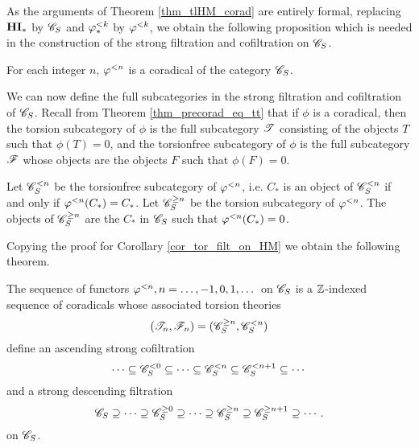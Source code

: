 As the arguments of Theorem \ref{thm_tlHM_corad} are 
entirely formal, replacing $\HM$ by $\CatLoc{C}{S}$ and $\tlHM{k}$ by
$\corad{k}$, we obtain the following proposition
which is needed in the construction of the strong filtration and
cofiltration on $\CatLoc{C}{S}$. 

\begin{prop}\label{prop_corad_loc_general}
For each integer $n$, $\corad{n}$ is a coradical of the category
$\CatLoc{C}{S}$.
\end{prop}

We can now define the full subcategories in the strong filtration
and cofiltration of $\CatLoc{C}{S}$. Recall from Theorem
\ref{thm_precorad_eq_tt} that if $\phi$ is a coradical, then the
torsion subcategory of $\phi$ is the full subcategory $\Cat{T}$
consisting of the objects $T$ such that $\phi(T) = 0$, and the
torsionfree subcategory of $\phi$ is the full subcategory $\Cat{F}$
whose objects are the objects $F$ such that $\phi(F) = 0$. 

\begin{defn}\label{def_torsion_filt_general}
Let $\Corad{n}{\CatLoc{C}{S}}$ be the torsionfree subcategory of
$\corad{n}$, i.e. $C_*$ is an object of $\Corad{n}{\CatLoc{C}{S}}$
if and only if $\corad{n}(C_*) = C_*$. Let 
$\Prerad{n}{\CatLoc{C}{S}}$ be the torsion subcategory of $\corad{n}$.
The objects of $\Prerad{n}{\CatLoc{C}{S}}$ are the $C_*$ in 
$\CatLoc{C}{S}$ such that $\corad{n}(C_*) = 0$.
\end{defn}

Copying the proof for Corollary \ref{cor_tor_filt_on_HM} we obtain 
the following theorem.

\begin{thm}
\label{thm_sum_heart_loc}
The sequence of functors $\corad{n}, n = \dots, -1, 0, 1, \dots$ on
$\CatLoc{C}{S}$ is a $\Z$-indexed sequence of coradicals whose 
associated torsion theories 
\[
(\Cat{T}_n, \Cat{F}_n) = (\Prerad{n}{\CatLoc{C}{S}}, \Corad{n}{\CatLoc{C}{S}})
\]
define an ascending strong cofiltration
\[
\cdots \subseteq \Corad{0}{\CatLoc{C}{S}} \subseteq \cdots \subseteq 
   \Corad{n}{\CatLoc{C}{S}} \subseteq \Corad{n + 1}{\CatLoc{C}{S}}
   \subseteq \cdots
\]
and a strong descending filtration
\[
\CatLoc{C}{S} \supseteq \cdots \supseteq \Prerad{0}{\CatLoc{C}{S}}
   \supseteq \cdots \supseteq \Prerad{n}{\CatLoc{C}{S}} \supseteq 
   \Prerad{n + 1}{\CatLoc{C}{S}} \supseteq \cdots.
\]
on $\CatLoc{C}{S}$.
\end{thm}

